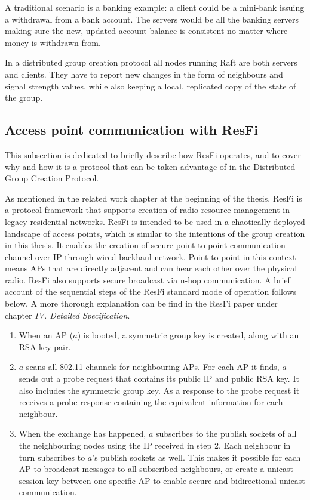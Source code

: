 A traditional scenario is a banking example: a client could be a mini-bank issuing a withdrawal from a bank account. The servers would be all the banking servers making sure the new,
updated account balance is consistent no matter where money is withdrawn from. 

In a distributed group creation protocol all nodes running Raft are both servers and clients. They have to report new changes in the form of neighbours and signal strength values,
while also keeping a local, replicated copy of the state of the group.

\subsection{Access point communication with ResFi}
This subsection is dedicated to briefly describe how ResFi operates, and to cover why and how it is a protocol that can be taken advantage of in the Distributed Group Creation Protocol. 

As mentioned in the related work chapter at the beginning of the thesis, ResFi is a protocol framework that supports creation of radio resource management in legacy residential networks.
ResFi is intended to be used in a chaotically deployed landscape of access points, which is similar to the intentions of the group creation in this thesis. It enables the creation of secure point-to-point communication channel over IP through wired backhaul network. Point-to-point in this context means APs that are directly adjacent and can hear each other over the physical radio. ResFi also supports secure broadcast via n-hop communication. A brief account of the sequential steps of the ResFi standard mode of operation follows below. A more thorough explanation can be find in the ResFi paper \cite{resfi} under chapter \textit{IV. Detailed Specification}.

\begin{enumerate}
	\item When an AP ($a$) is booted, a symmetric group key is created, along with an RSA key-pair. 
	\item $a$ scans all 802.11 channels for neighbouring APs. For each AP it finds, $a$ sends out a probe request that contains its public IP and public RSA key. It also includes
		the symmetric group key. As a response to the probe request it receives a probe response containing the equivalent information for each neighbour. 
	\item When the exchange has happened, $a$ subscribes to the publish sockets of all the neighbouring nodes using the IP received in step 2. Each neighbour in turn subscribes to $a$'s
		publish sockets as well. This makes it possible for each AP to broadcast messages to all subscribed neighbours,
		or create a unicast session key between one specific AP to enable secure and bidirectional unicast communication.
\end{enumerate}

